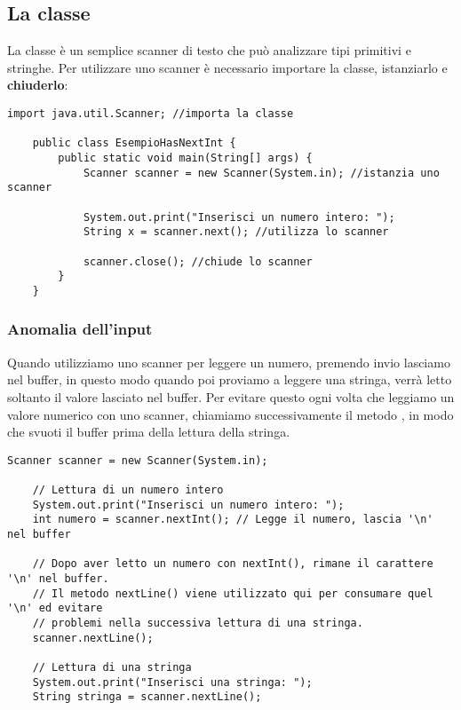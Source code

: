 \documentclass[../main.tex]{subfiles}
\begin{document}
\subsection{La classe }
La classe  è un semplice scanner di testo che può analizzare tipi primitivi e stringhe.
Per utilizzare uno scanner è necessario importare la classe, istanziarlo e \textbf{chiuderlo}:
\begin{lstlisting}[style=java]
    import java.util.Scanner; //importa la classe

    public class EsempioHasNextInt {
        public static void main(String[] args) {
            Scanner scanner = new Scanner(System.in); //istanzia uno scanner

            System.out.print("Inserisci un numero intero: ");
            String x = scanner.next(); //utilizza lo scanner

            scanner.close(); //chiude lo scanner
        }
    }

\end{lstlisting}

\subsubsection{Anomalia dell'input}
Quando utilizziamo uno scanner per leggere un numero, premendo invio lasciamo  nel buffer, in questo modo  quando
poi proviamo a leggere una stringa, verrà letto soltanto il valore lasciato nel buffer. Per evitare questo ogni volta che leggiamo
un valore numerico con uno scanner, chiamiamo successivamente il metodo , in modo che svuoti il buffer prima della
lettura della stringa.
\begin{lstlisting}[style=java]
    Scanner scanner = new Scanner(System.in);

    // Lettura di un numero intero
    System.out.print("Inserisci un numero intero: ");
    int numero = scanner.nextInt(); // Legge il numero, lascia '\n' nel buffer

    // Dopo aver letto un numero con nextInt(), rimane il carattere '\n' nel buffer.
    // Il metodo nextLine() viene utilizzato qui per consumare quel '\n' ed evitare
    // problemi nella successiva lettura di una stringa.
    scanner.nextLine();

    // Lettura di una stringa
    System.out.print("Inserisci una stringa: ");
    String stringa = scanner.nextLine();
\end{lstlisting}
\end{document}
